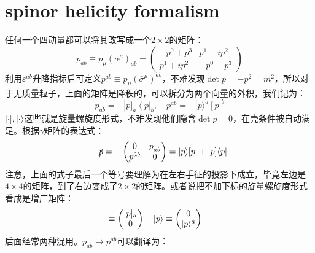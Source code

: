 \section{spinor helicity formalism}
任何一个四动量都可以将其改写成一个$2\times 2$的矩阵：
\begin{equation}
	p_{a\dot b}\equiv p_{\mu}\left(\sigma^{\mu}\right)_{a\dot b}=\begin{pmatrix}-p^0+p^3&p^1-ip^2\\p^1+ip^2&-p^0-p^3\end{pmatrix}
\end{equation}
利用$\varepsilon^{ab}$升降指标\sn{\[\begin{aligned}
		&\varepsilon^{12}=\varepsilon^{\dot{1}\dot{2}}=\varepsilon_{21}=\varepsilon_{\dot{2}\dot{1}}=+1,\\
		&\varepsilon^{21}=\varepsilon^{\dot{2}\dot{1}}=\varepsilon_{12}=\varepsilon_{\dot{1}\dot{2}}=-1
	\end{aligned}\]}后可定义$p^{\dot{a}b}\equiv p_{\mu}(\bar{\sigma}^{\mu})^{\dot{a}b}$，不难发现$\det p=-p^2=m^2$，所以对于无质量粒子，上面的矩阵是降秩的，可以拆分为两个向量的外积，我们记为：
\begin{equation}
	\boxed{
		p_{a\dot b}=-|p]_a\left<p\right|_{\dot b},\quad p^{\dot{a}b}=-|p\rangle^{\dot{a}}\left[p\right|^b
	}
\end{equation}
$|\cdot],|\cdot\rangle$这些就是旋量螺旋度形式，不难发现他们隐含$\det p=0$，在壳条件被自动满足。根据$\gamma$矩阵的表达式：
\begin{equation}
	-\slashed{p}=-\begin{pmatrix}0&p_{a\dot{b}}\\p^{\dot{a}b}&0\end{pmatrix}=|p\rangle[p|+|p]\langle p|
\end{equation}
注意，上面的式子最后一个等号要理解为在左右手征的投影下成立，毕竟左边是$4\times 4$的矩阵，到了右边变成了$2\times2$的矩阵。或者说把不加下标的旋量螺旋度形式看成是增广矩阵：
\begin{equation}
	[p|\equiv\left([p|^a,0\right)\quad
	\bra{p}\equiv \left(0,\bra{p}_{\dot a}\right)\quad
	|p]\equiv \begin{pmatrix}|p]_a\\0\end{pmatrix}\quad
	\ket{p}\equiv\begin{pmatrix}0\\|p\rangle^{\dot{a}}\end{pmatrix}\quad
\end{equation}
后面经常两种混用\sn{这种混用不会对后面的恒等式产生任何影响，而且这种四分量的形式相比于两分量的形式能提醒我们单独的$\ket{\cdot}$和$|\cdot]$不能形成内积}。$p_{a\dot b}\to p^{\dot a b}$可以翻译为：
